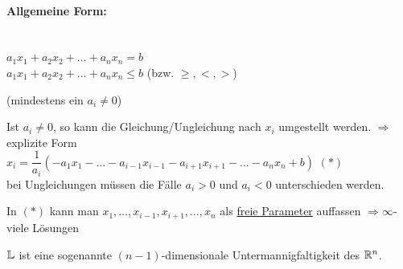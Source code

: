\paragraph{Allgemeine Form:}\quad\\
$a_1x_1+a_2x_2+\ldots+a_nx_n=b$ \\
$a_1x_1+a_2x_2+\ldots+a_nx_n\le b$  (bzw. $\ge, <,>$)

(mindestens ein $a_i\ne0$)

Ist $a_i\ne0$, so kann die Gleichung/Ungleichung nach $x_i$ umgestellt werden. $\Rightarrow$ explizite Form\\
$x_i = \dfrac{1}{a_i}(-a_1x_1-\ldots-a_{i-1}x_{i-1}-a_{i+1}x_{i+1}-\ldots-a_nx_n+b)$ $(*)$\\
bei Ungleichungen müssen die Fälle $a_i > 0$ und $a_i < 0$ unterschieden werden.

In $(*)$ kann man $x_1,\ldots,x_{i-1},x_{i+1},\ldots,x_n$ als \ul{freie Parameter} auffassen $\Rightarrow \infty$-viele Lösungen

$\mathbb{L}$ ist eine sogenannte $(n-1)$-dimensionale Untermannigfaltigkeit des $\mathbb{R}^n$.

